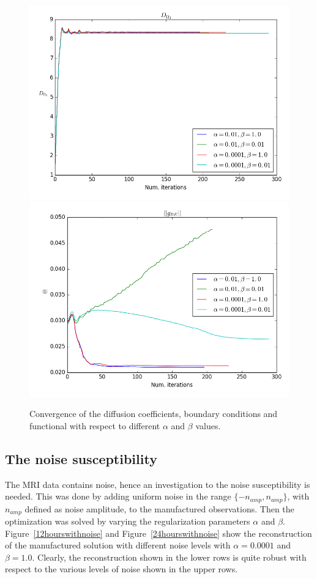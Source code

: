 \documentclass[11pt,a4paper]{article}
\begin{document}
\begin{figure}
\includegraphics[scale=0.2]{convergence_3}  
\includegraphics[scale=0.2]{convergence_4}  
\label{convergence}
\caption{Convergence of the diffusion coefficients, boundary conditions and functional with respect to different $\alpha$ and $\beta$ values. } 
\end{figure}



\subsection{The noise susceptibility}
The MRI data contains noise, hence an investigation to the noise susceptibility is needed. This was done by adding uniform noise in the range $\lbrace -n_{amp} , n_{amp} \rbrace $, with $n_{amp}$ defined as noise amplitude, to the manufactured observations. Then the optimization was solved by varying the regularization parameters $\alpha$ and $\beta$. Figure~\ref{12hourswithnoise} and Figure~\ref{24hourswithnoise} show the reconstruction of the manufactured solution with 
different noise levels with $\alpha=0.0001$ and $\beta=1.0$. Clearly, the reconstruction shown in the lower rows is quite robust with respect to the various levels
of noise shown in the upper rows.      
\end{document}
